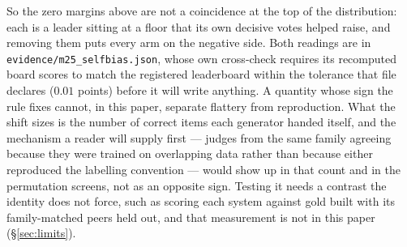 \documentclass{article}
\newcommand{\ids}[1]{\texttt{\small #1}} %
\begin{document}
So the zero margins above are not
a coincidence at the top of the distribution: each is a leader sitting at a floor that its own decisive votes
helped raise, and removing them puts every arm on the negative side. Both readings are in
\ids{evidence/m25\_selfbias.json}, whose own cross-check requires its recomputed board scores to match the
registered leaderboard within the tolerance that file declares ($0.01$ points) before it will write anything.
A quantity whose sign the rule fixes cannot, in this paper, separate flattery from reproduction. What the shift sizes
is the number of correct items each generator handed itself, and the mechanism a reader will supply first ---
judges from the same family agreeing because they were trained on overlapping data rather than because either
reproduced the labelling convention --- would show up in that count and in the permutation screens, not as an
opposite sign. Testing it needs a contrast the identity does not force, such as scoring each system against gold
built with its family-matched peers held out, and that measurement is not in this paper
(\S\ref{sec:limits}).
\end{document}
